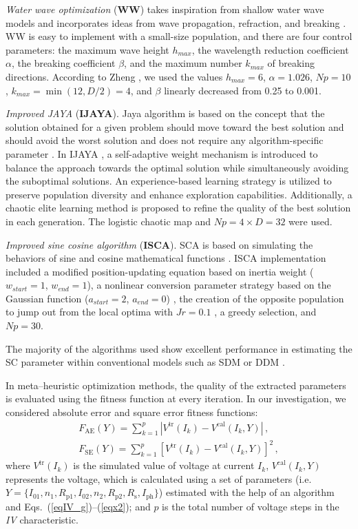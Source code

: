 \documentclass[a4paper,fleqn]{cas-sc}
\begin{document}
\emph{Water wave optimization} (\textbf{WW}) takes inspiration from shallow water wave models
and incorporates  ideas from wave propagation, refraction, and breaking \cite{WW}.
WW is easy to implement with a small-size population, and there are four control parameters:
the maximum wave height $h_{max}$,
the wavelength reduction coefficient $\alpha$,
the breaking coefficient $\beta$,
and the maximum number $k_{max}$ of breaking directions.
According to Zheng \cite{WW}, we used
the values $h_{max}=6$, $\alpha=1.026$,  $N\!p=10$,
$k_{max}=\min(12,D/2)=4$, and $\beta$ linearly decreased from 0.25 to 0.001.

\emph{Improved JAYA} (\textbf{IJAYA}).
Jaya algorithm is based on the concept
that the solution obtained for a given problem should move toward the best solution and should
avoid the worst solution and does not require any algorithm-specific parameter \cite{JAYA}.
In IJAYA \cite{IJAYA}, a self-adaptive weight mechanism is introduced to balance
the approach towards the optimal solution while simultaneously avoiding the suboptimal solutions.
An experience-based learning strategy is utilized to preserve population diversity and enhance exploration capabilities.
Additionally, a chaotic elite learning method is proposed to refine the quality of the best solution in each generation.
The logistic chaotic map and $N\!p=4\times D=32$ were used.

\emph{Improved sine cosine algorithm} (\textbf{ISCA}).
SCA is based on simulating the behaviors of sine and cosine mathematical functions \cite{SCA}.
ISCA implementation included a modified position-updating equation based on inertia weight
($w_{start}=1$, $w_{end}=1$),
a nonlinear conversion parameter strategy based on the Gaussian function
($a_{start}=2$, $a_{end}=0$) \cite{ISCA2},
the creation of the opposite population to jump out from the local optima with $J\!r=0.1$ \cite{ISCA3},
a greedy selection, and $N\!p=30$.

The majority of the algorithms used show excellent performance
in estimating the SC parameter within conventional models such as SDM or DDM
\cite{CWOA,DEWang,GOTLBO,IJAYA,MABC,PSO,STLBO,TLBO_Patel,LSHADE,IWOA}.


In meta--heuristic optimization methods, the quality of the extracted parameters is evaluated using the fitness function at
every iteration.
In our investigation, we considered absolute error and square error fitness functions:
\begin{gather}
\label{eqFae}
F_\mathrm{AE}(Y)= \sum_{k=1}^p \left|V^\mathrm{tr}(I_k)-V^\mathrm{cal}(I_k,Y)\right|\,,\\
\label{eqFse}
F_\mathrm{SE}(Y)= \sum_{k=1}^p \left[V^\mathrm{tr}(I_k)-V^\mathrm{cal}(I_k,Y)\right]^2\,,
\end{gather}
where
$V^\mathrm{tr}(I_k)$ is the simulated value of voltage at current $I_k$,
$V^\mathrm{cal}(I_k,Y)$ represents the voltage,
which is calculated using a set of parameters
(i.e. $Y = \{I_{01},n_1,R_\mathrm{p1},I_{02},n_2,R_\mathrm{p2},R_\mathrm{s},I_\mathrm{ph}\}$)
estimated with the help of an algorithm and Eqs.~(\ref{eqIV_g})--(\ref{eqx2});
and $p$ is the total number of voltage steps in the \emph{IV} characteristic.
\end{document}
